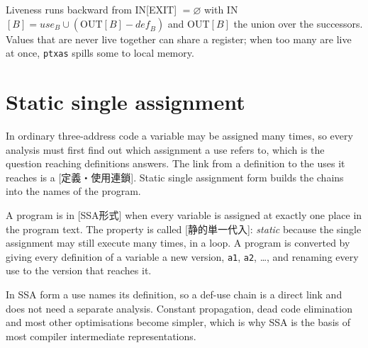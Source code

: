 \documentclass[../main.tex]{subfiles}
\begin{document}
\begin{keypoint}
  Liveness runs backward from IN[EXIT] $= \varnothing$ with
  IN$[B] = \mathit{use}_B \cup (\mathrm{OUT}[B] - \mathit{def}_B)$ and
  OUT$[B]$ the union over the successors.  Values that are never live
  together can share a register; when too many are live at once,
  \texttt{ptxas} spills some to local memory.
\end{keypoint}

\section{Static single assignment}
\label{sec:l11-ssa}

In ordinary three-address code a variable may be assigned many times,
so every analysis must first find out which assignment a use
refers to, which is the question reaching definitions
answers.  The link
from a definition to the uses it reaches is a
[定義・使用連鎖].  Static single assignment form
builds the chains into the names of the program.

\begin{definition}
  \label{def:l11-ssa}
  A program is in [SSA形式] when every variable is
  assigned at exactly one place in the program text.  The property is
  called [静的単一代入]:
  \emph{static} because the single assignment may still execute many
  times, in a loop.  A program is converted by giving every definition
  of a variable a new version, \texttt{a1}, \texttt{a2}, \ldots, and
  renaming every use to the version that reaches it.
\end{definition}

%
In SSA form a use names its definition, so a def-use chain is a direct
link and does not need a separate analysis.  Constant propagation, dead
code elimination and most other optimisations become simpler, which is
why SSA is the basis of most compiler intermediate representations.
\end{document}
